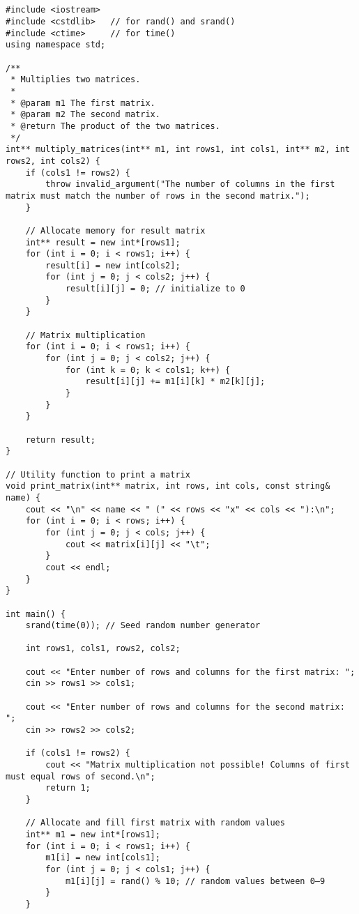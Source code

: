 \documentclass[12pt,a4paper]{article}
\begin{document}
\subsection{}
\begin{lstlisting}
#include <iostream>
#include <cstdlib>   // for rand() and srand()
#include <ctime>     // for time()
using namespace std;

/**
 * Multiplies two matrices.
 *
 * @param m1 The first matrix.
 * @param m2 The second matrix.
 * @return The product of the two matrices.
 */
int** multiply_matrices(int** m1, int rows1, int cols1, int** m2, int rows2, int cols2) {
    if (cols1 != rows2) {
        throw invalid_argument("The number of columns in the first matrix must match the number of rows in the second matrix.");
    }

    // Allocate memory for result matrix
    int** result = new int*[rows1];
    for (int i = 0; i < rows1; i++) {
        result[i] = new int[cols2];
        for (int j = 0; j < cols2; j++) {
            result[i][j] = 0; // initialize to 0
        }
    }

    // Matrix multiplication
    for (int i = 0; i < rows1; i++) {
        for (int j = 0; j < cols2; j++) {
            for (int k = 0; k < cols1; k++) {
                result[i][j] += m1[i][k] * m2[k][j];
            }
        }
    }

    return result;
}

// Utility function to print a matrix
void print_matrix(int** matrix, int rows, int cols, const string& name) {
    cout << "\n" << name << " (" << rows << "x" << cols << "):\n";
    for (int i = 0; i < rows; i++) {
        for (int j = 0; j < cols; j++) {
            cout << matrix[i][j] << "\t";
        }
        cout << endl;
    }
}

int main() {
    srand(time(0)); // Seed random number generator

    int rows1, cols1, rows2, cols2;

    cout << "Enter number of rows and columns for the first matrix: ";
    cin >> rows1 >> cols1;

    cout << "Enter number of rows and columns for the second matrix: ";
    cin >> rows2 >> cols2;

    if (cols1 != rows2) {
        cout << "Matrix multiplication not possible! Columns of first must equal rows of second.\n";
        return 1;
    }

    // Allocate and fill first matrix with random values
    int** m1 = new int*[rows1];
    for (int i = 0; i < rows1; i++) {
        m1[i] = new int[cols1];
        for (int j = 0; j < cols1; j++) {
            m1[i][j] = rand() % 10; // random values between 0–9
        }
    }


\end{lstlisting}
\end{document}

